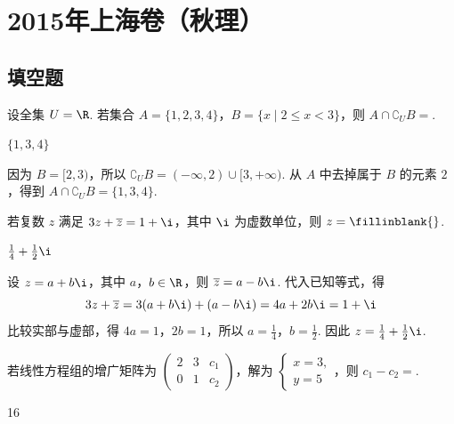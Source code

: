 \chapter{2015年上海卷（秋理）}

\section{填空题}

\begin{problem}
设全集 \(U = \R\). 若集合 \(A = \{1, 2, 3, 4\}\)，\(B = \{x \mid 2 \leqslant x < 3\}\)，则 \(A \cap \complement_U B = \)\fillinblank{}.
\end{problem}

\begin{answer}
\(\{1,3,4\}\)
\end{answer}

\begin{solution}
因为 \(B=[2,3)\)，所以 \(\complement_U B=(-\infty,2)\cup[3,+\infty)\). 从 \(A\) 中去掉属于 \(B\) 的元素 \(2\)，得到 \(A\cap\complement_U B=\{1,3,4\}\).
\end{solution}

\begin{problem}
若复数 \(z\) 满足 \(3z + \overline{z} = 1 + \i\)，其中 \(\i\) 为虚数单位，则 \(z =\fillinblank{}\).
\end{problem}

\begin{answer}
\(\frac{1}{4}+\frac{1}{2}\i\)
\end{answer}

\begin{solution}
设 \(z=a+b\i\)，其中 \(a\)，\(b\in\R\)，则 \(\overline{z}=a-b\i\). 代入已知等式，得
\[
3z+\overline{z}=3(a+b\i)+(a-b\i)=4a+2b\i=1+\i
\]
比较实部与虚部，得 \(4a=1\)，\(2b=1\)，所以 \(a=\frac14\)，\(b=\frac12\). 因此 \(z=\frac14+\frac12\i\).
\end{solution}

\begin{problem}
若线性方程组的增广矩阵为 \(\begin{pmatrix}2 & 3 & c_1\\ 0 & 1 & c_2 \end{pmatrix}\)，解为 \(\begin{cases}
x = 3,\\
y = 5
\end{cases}\)，则 \(c_{1} - c_{2} =\)\fillinblank{}.
\end{problem}

\begin{answer}
16
\end{answer}

